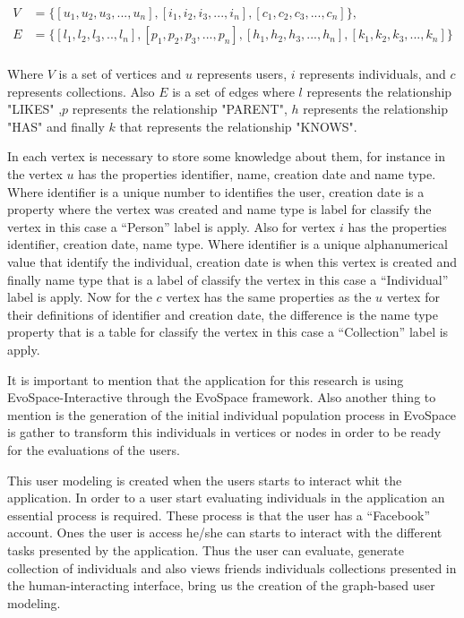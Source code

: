 \begin{equation*}\label{eq:graphRelDef} 
\displaystyle 
\begin{split} 
V &= \{[u_1,u_2,u_3,...,u_n],[i_1,i_2,i_3,...,i_n],[c_1,c_2,c_3,...,c_n]\},\\ 
E&= \{[l_1,l_2,l_3,..,l_n],[p_1,p_2,p_3,...,p_n],[h_1,h_2,h_3,...,h_n],[k_1,k_2,k_3,...,k_n]\}\\ 
\end{split} 
\end{equation*} 

Where $V$ is a set of vertices and $u$ represents users, $i$ represents
individuals, and $c$ represents collections. Also $E$ is a set of edges where
$l$ represents the relationship "LIKES" ,$p$ represents the relationship
"PARENT", $h$ represents the relationship "HAS" and finally $k$ that represents
the relationship "KNOWS".

In each vertex is necessary to store some knowledge about them, for instance in
the vertex $u$ has the properties identifier, name, creation date and name type.
Where identifier is a unique number to identifies the user, creation date is a
property where the vertex was created and name type is label for classify the
vertex in this case a “Person” label is apply. Also for vertex $i$ has the
properties identifier,  creation date, name type. Where identifier is a unique
alphanumerical value  that identify the individual, creation date is when this
vertex is created and finally name type that is a label of classify the vertex
in this case a “Individual” label is apply. Now for the  $c$ vertex has the same
properties as the $u$ vertex for their definitions of identifier and creation
date, the difference is the name type property that is a table for classify the
vertex in this case a “Collection” label is apply.

It is important to mention that the application for this research is using
EvoSpace-Interactive through the EvoSpace framework. Also another thing to
mention  is the generation of the initial individual population process in
EvoSpace is gather to transform this individuals in vertices or nodes in order
to  be ready for the evaluations of the users.
 
This user modeling is created when the users starts to interact whit the
application. In order to a user start evaluating individuals  in the application
an essential process is required. These process is that the user has a
“Facebook” account. Ones the user is access he/she can starts to interact with
the different tasks presented by the application. Thus the user can evaluate,
generate collection of individuals and also views friends individuals
collections presented in the human-interacting interface, bring us the creation
of the graph-based user modeling.




